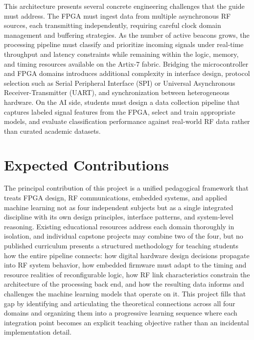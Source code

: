 \documentclass[10pt]{article}
\begin{document}
	This architecture presents several concrete engineering challenges that the guide must address. The FPGA must ingest data from multiple asynchronous RF sources, each transmitting independently, requiring careful clock domain management and buffering strategies. As the number of active beacons grows, the processing pipeline must classify and prioritize incoming signals under real-time throughput and latency constraints while remaining within the logic, memory, and timing resources available on the Artix-7 fabric. Bridging the microcontroller and FPGA domains introduces additional complexity in interface design, protocol selection such as Serial Peripheral Interface (SPI) or Universal Asynchronous Receiver-Transmitter (UART), and synchronization between heterogeneous hardware. On the AI side, students must design a data collection pipeline that captures labeled signal features from the FPGA, select and train appropriate models, and evaluate classification performance against real-world RF data rather than curated academic datasets.
	
	\section{Expected Contributions}
	
	The principal contribution of this project is a unified pedagogical framework that treats FPGA design, RF communications, embedded systems, and applied machine learning not as four independent subjects but as a single integrated discipline with its own design principles, interface patterns, and system-level reasoning. Existing educational resources address each domain thoroughly in isolation, and individual capstone projects may combine two of the four, but no published curriculum presents a structured methodology for teaching students how the entire pipeline connects: how digital hardware design decisions propagate into RF system behavior, how embedded firmware must adapt to the timing and resource realities of reconfigurable logic, how RF link characteristics constrain the architecture of the processing back end, and how the resulting data informs and challenges the machine learning models that operate on it. This project fills that gap by identifying and articulating the theoretical connections across all four domains and organizing them into a progressive learning sequence where each integration point becomes an explicit teaching objective rather than an incidental implementation detail.
	
\end{document}
